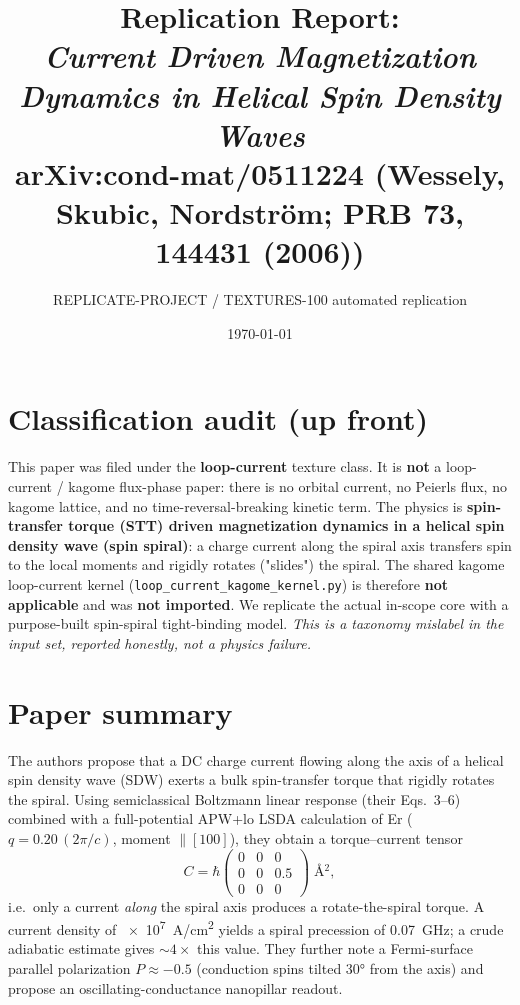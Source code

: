\documentclass[11pt]{article}
\title{Replication Report: \\ \emph{Current Driven Magnetization Dynamics in Helical Spin Density Waves}\\ \normalsize arXiv:cond-mat/0511224 (Wessely, Skubic, Nordstr\"om; PRB \textbf{73}, 144431 (2006))}
\author{REPLICATE-PROJECT / TEXTURES-100 automated replication}
\date{\today}
\begin{document}
\maketitle

\section*{Classification audit (up front)}
This paper was filed under the \textbf{loop-current} texture class. It is
\textbf{not} a loop-current / kagome flux-phase paper: there is no orbital
current, no Peierls flux, no kagome lattice, and no time-reversal-breaking
kinetic term. The physics is \textbf{spin-transfer torque (STT) driven
magnetization dynamics in a helical spin density wave (spin spiral)}: a charge
current along the spiral axis transfers spin to the local moments and rigidly
rotates ("slides") the spiral. The shared kagome loop-current kernel
(\texttt{loop\_current\_kagome\_kernel.py}) is therefore \textbf{not applicable}
and was \textbf{not imported}. We replicate the actual in-scope core with a
purpose-built spin-spiral tight-binding model. \emph{This is a taxonomy
mislabel in the input set, reported honestly, not a physics failure.}

\section{Paper summary}
The authors propose that a DC charge current flowing along the axis of a
helical spin density wave (SDW) exerts a bulk spin-transfer torque that rigidly
rotates the spiral. Using semiclassical Boltzmann linear response (their
Eqs.~3--6) combined with a full-potential APW+lo LSDA calculation of Er
($q=0.20\,(2\pi/c)$, moment $\parallel[100]$), they obtain a torque--current
tensor
\begin{equation}
  C=\hbar\begin{pmatrix}0&0&0\\0&0&0.5\\0&0&0\end{pmatrix}\;\si{\angstrom^2},
\end{equation}
i.e.\ only a current \emph{along} the spiral axis produces a
rotate-the-spiral torque. A current density of \SI{e7}{A/cm^2} yields a spiral
precession of \SI{0.07}{GHz}; a crude adiabatic estimate gives $\sim 4\times$
this value. They further note a Fermi-surface parallel polarization
$P\approx-0.5$ (conduction spins tilted \ang{30} from the axis) and propose an
oscillating-conductance nanopillar readout.
\end{document}
